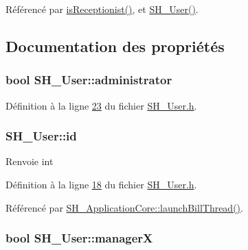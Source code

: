 Référencé par \hyperlink{classSH__User_a6e78a5559a202eb3f2bd79e50768da7f}{is\-Receptionist()}, et \hyperlink{classSH__User_a96c0ebb3f11c1654935aaecb92295724}{S\-H\-\_\-\-User()}.



\subsection{Documentation des propriétés}
\hypertarget{classSH__User_ab57f23cf224a8c5bdd191ca501549220}{
\subsubsection[{administrator}]{\setlength{\rightskip}{0pt plus 5cm}bool S\-H\-\_\-\-User\-::administrator\hspace{0.3cm}{\ttfamily [read]}}}\label{classSH__User_ab57f23cf224a8c5bdd191ca501549220}


Définition à la ligne \hyperlink{SH__User_8h_source_l00023}{23} du fichier \hyperlink{SH__User_8h_source}{S\-H\-\_\-\-User.\-h}.

\hypertarget{classSH__User_a187ee34e1d6d3466f3852e091cdb69e9}{
\subsubsection[{id}]{\setlength{\rightskip}{0pt plus 5cm}S\-H\-\_\-\-User\-::id\hspace{0.3cm}{\ttfamily [read]}}}\label{classSH__User_a187ee34e1d6d3466f3852e091cdb69e9}
\begin{DoxyReturn}{Renvoie}
int 
\end{DoxyReturn}


Définition à la ligne \hyperlink{SH__User_8h_source_l00018}{18} du fichier \hyperlink{SH__User_8h_source}{S\-H\-\_\-\-User.\-h}.



Référencé par \hyperlink{classSH__ApplicationCore_ab72fd6cdc47575d47157fc7bdffae8f2}{S\-H\-\_\-\-Application\-Core\-::launch\-Bill\-Thread()}.

\hypertarget{classSH__User_a1794a1229076bcaf2de708146db574b3}{
\subsubsection[{manager\-X}]{\setlength{\rightskip}{0pt plus 5cm}bool S\-H\-\_\-\-User\-::manager\-X\hspace{0.3cm}{\ttfamily [read]}}}\label{classSH__User_a1794a1229076bcaf2de708146db574b3}


